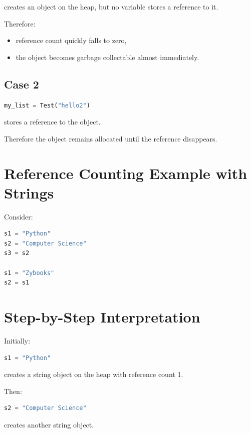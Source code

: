 \documentclass[11pt]{article}
\begin{document}
creates an object on the heap, but no variable stores a reference to it.

Therefore:

\begin{itemize}
    \item reference count quickly falls to zero,
    \item the object becomes garbage collectable almost immediately.
\end{itemize}

\subsection{Case 2}

\begin{lstlisting}[language=Python]
my_list = Test("hello2")
\end{lstlisting}

stores a reference to the object.

Therefore the object remains allocated until the reference disappears.

\section{Reference Counting Example with Strings}

Consider:

\begin{lstlisting}[language=Python]
s1 = "Python"
s2 = "Computer Science"
s3 = s2

s1 = "Zybooks"
s2 = s1
\end{lstlisting}

\section{Step-by-Step Interpretation}

Initially:

\begin{lstlisting}[language=Python]
s1 = "Python"
\end{lstlisting}

creates a string object on the heap with reference count 1.

Then:

\begin{lstlisting}[language=Python]
s2 = "Computer Science"
\end{lstlisting}

creates another string object.
\end{document}
